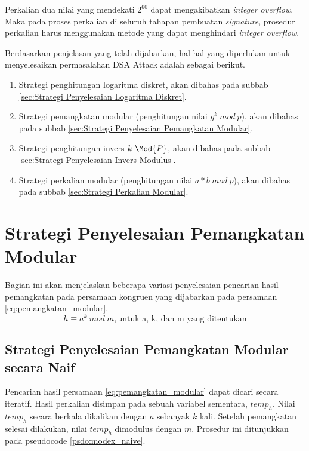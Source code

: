 Perkalian dua nilai yang mendekati $2^{60}$ dapat mengakibatkan \textit{integer overflow}. Maka pada proses perkalian di seluruh tahapan pembuatan \textit{signature}, prosedur perkalian harus menggunakan metode yang dapat menghindari \textit{integer overflow}.

Berdasarkan penjelasan yang telah dijabarkan, hal-hal yang diperlukan untuk menyelesaikan permasalahan DSA Attack adalah sebagai berikut.

\begin{enumerate}
	\item Strategi penghitungan logaritma diskret, akan dibahas pada subbab \ref{sec:Strategi Penyelesaian Logaritma Diskret}.
	\item Strategi pemangkatan modular (penghitungan nilai $ g^k\ mod\ p $), akan dibahas pada subbab \ref{sec:Strategi Penyelesaian Pemangkatan Modular}.
	\item Strategi penghitungan invers $ k\ \Mod{P} $, akan dibahas pada subbab \ref {sec:Strategi Penyelesaian Invers Modulus}.
	\item Strategi perkalian modular (penghitungan nilai $ a * b\ mod\ p $), akan dibahas pada subbab \ref{sec:Strategi Perkalian Modular}.
\end{enumerate}

\section{Strategi Penyelesaian Pemangkatan Modular}
Bagian ini akan menjelaskan beberapa variasi penyelesaian pencarian hasil pemangkatan pada persamaan kongruen yang dijabarkan pada persamaan \eqref{eq:pemangkatan_modular}.
\begin{equation}
h \equiv a^k\ mod\ m,\text{untuk a, k, dan m yang ditentukan}
\label{eq:pemangkatan_modular}
\end{equation}

\subsection{Strategi Penyelesaian Pemangkatan Modular secara Naif}
Pencarian hasil persamaan \eqref{eq:pemangkatan_modular} dapat dicari secara iteratif. Hasil perkalian disimpan pada sebuah variabel sementara, $temp_h$. Nilai $temp_h$ secara berkala dikalikan dengan $a$ sebanyak $k$ kali. Setelah pemangkatan selesai dilakukan, nilai $temp_h$ dimodulus dengan $ m $. Prosedur ini ditunjukkan pada pseudocode \ref{psdo:modex_naive}.

